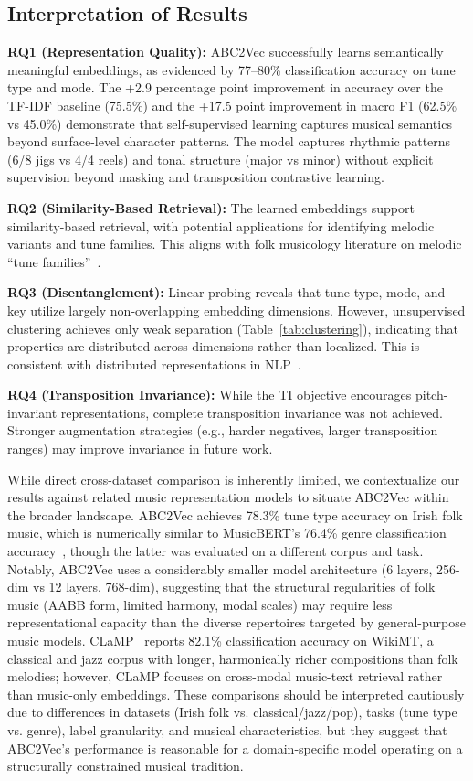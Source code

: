 \documentclass[]{interact}
\theoremstyle{plain}
\theoremstyle{definition}
\theoremstyle{remark}
\begin{document}
\subsection{Interpretation of Results}

\textbf{RQ1 (Representation Quality):} ABC2Vec successfully learns semantically meaningful embeddings, as evidenced by 77--80\% classification accuracy on tune type and mode. The +2.9 percentage point improvement in accuracy over the TF-IDF baseline (75.5\%) and the +17.5 point improvement in macro F1 (62.5\% vs 45.0\%) demonstrate that self-supervised learning captures musical semantics beyond surface-level character patterns. The model captures rhythmic patterns (6/8 jigs vs 4/4 reels) and tonal structure (major vs minor) without explicit supervision beyond masking and transposition contrastive learning.

\textbf{RQ2 (Similarity-Based Retrieval):} The learned embeddings support similarity-based retrieval, with potential applications for identifying melodic variants and tune families. This aligns with folk musicology literature on melodic ``tune families''~\cite{FolkMusicVariation2017}.

\textbf{RQ3 (Disentanglement):} Linear probing reveals that tune type, mode, and key utilize largely non-overlapping embedding dimensions. However, unsupervised clustering achieves only weak separation (Table~\ref{tab:clustering}), indicating that properties are distributed across dimensions rather than localized. This is consistent with distributed representations in NLP~\cite{BERT2019}.

\textbf{RQ4 (Transposition Invariance):} While the TI objective encourages pitch-invariant representations, complete transposition invariance was not achieved. Stronger augmentation strategies (e.g., harder negatives, larger transposition ranges) may improve invariance in future work.


While direct cross-dataset comparison is inherently limited, we contextualize our results against related music representation models to situate ABC2Vec within the broader landscape. ABC2Vec achieves 78.3\% tune type accuracy on Irish folk music, which is numerically similar to MusicBERT's 76.4\% genre classification accuracy~\cite{MusicBERT2022}, though the latter was evaluated on a different corpus and task. Notably, ABC2Vec uses a considerably smaller model architecture (6 layers, 256-dim vs 12 layers, 768-dim), suggesting that the structural regularities of folk music (AABB form, limited harmony, modal scales) may require less representational capacity than the diverse repertoires targeted by general-purpose music models. CLaMP~\cite{CLaMP2023} reports 82.1\% classification accuracy on WikiMT, a classical and jazz corpus with longer, harmonically richer compositions than folk melodies; however, CLaMP focuses on cross-modal music-text retrieval rather than music-only embeddings. These comparisons should be interpreted cautiously due to differences in datasets (Irish folk vs. classical/jazz/pop), tasks (tune type vs. genre), label granularity, and musical characteristics, but they suggest that ABC2Vec's performance is reasonable for a domain-specific model operating on a structurally constrained musical tradition.
\end{document}
